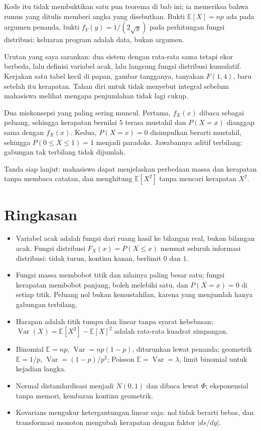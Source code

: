 Kode itu tidak membuktikan satu pun teorema di bab ini; ia memeriksa bahwa rumus yang
ditulis memberi angka yang disebutkan. Bukti $\mathbb{E}[X]=np$ ada pada argumen
penanda, bukti $f_Y(y)=1/(2\sqrt y)$ pada perhitungan fungsi distribusi; keluaran
program adalah data, bukan argumen.

\begin{untukdosen}
Urutan yang saya sarankan: dua sistem dengan rata-rata sama tetapi ekor berbeda, lalu
definisi variabel acak, lalu langsung fungsi distribusi kumulatif. Kerjakan satu tabel
kecil di papan, gambar tangganya, tanyakan $F(1{,}4)$, baru setelah itu kerapatan.
Tahan diri untuk tidak menyebut integral sebelum mahasiswa melihat mengapa penjumlahan
tidak lagi cukup.

Dua miskonsepsi yang paling sering muncul. Pertama, $f_X(x)$ dibaca sebagai peluang,
sehingga kerapatan bernilai $5$ terasa mustahil dan $P(X=x)$ dianggap sama dengan
$f_X(x)$. Kedua, $P(X=x)=0$ disimpulkan berarti mustahil, sehingga
$P(0\le X\le1)=1$ menjadi paradoks. Jawabannya aditif terbilang: gabungan tak
terbilang tidak dijumlah.

Tanda siap lanjut: mahasiswa dapat menjelaskan perbedaan massa dan kerapatan tanpa
membaca catatan, dan menghitung $\mathbb{E}[X^2]$ tanpa mencari kerapatan $X^2$.
\end{untukdosen}

\section{Ringkasan}

\begin{ringkasan}
\begin{itemize}
\item Variabel acak adalah fungsi dari ruang hasil ke bilangan real, bukan bilangan
      acak. Fungsi distribusi $F_X(x)=P(X\le x)$ memuat seluruh informasi distribusi:
      tidak turun, kontinu kanan, berlimit $0$ dan $1$.
\item Fungsi massa membobot titik dan nilainya paling besar satu; fungsi kerapatan
      membobot panjang, boleh melebihi satu, dan $P(X=x)=0$ di setiap titik. Peluang
      nol bukan kemustahilan, karena yang menjumlah hanya gabungan terbilang.
\item Harapan adalah titik tumpu dan linear tanpa syarat kebebasan;
      $\operatorname{Var}(X)=\mathbb{E}[X^2]-\mathbb{E}[X]^2$ adalah rata-rata kuadrat
      simpangan.
\item Binomial $\mathbb{E}=np$, $\operatorname{Var}=np(1-p)$, diturunkan lewat
      penanda; geometrik $\mathbb{E}=1/p$, $\operatorname{Var}=(1-p)/p^2$; Poisson
      $\mathbb{E}=\operatorname{Var}=\lambda$, limit binomial untuk kejadian langka.
\item Normal distandardisasi menjadi $N(0,1)$ dan dibaca lewat $\Phi$; eksponensial
      tanpa memori, kembaran kontinu geometrik.
\item Kovarians mengukur ketergantungan linear saja: nol tidak berarti bebas, dan
      transformasi monoton mengubah kerapatan dengan faktor $|ds/dy|$.
\end{itemize}
\end{ringkasan}


